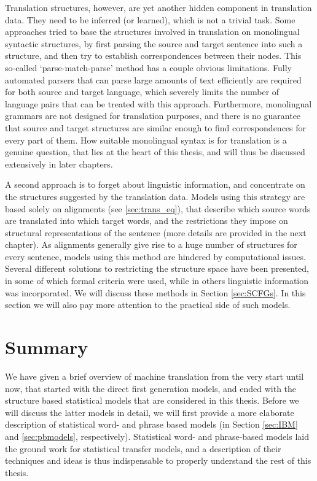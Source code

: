 Translation structures, however, are yet another hidden component in translation data. They need to be inferred (or learned), which is not a trivial task. Some approaches tried to base the structures involved in translation on monolingual syntactic structures, by first parsing the source and target sentence into such a structure, and then try to establish correspondences between their nodes. This so-called `parse-match-parse' method has a couple obvious limitations. Fully automated parsers that can parse large amounts of text efficiently are required for both source and target language, which severely limits the number of language pairs that can be treated with this approach. Furthermore, monolingual grammars are not designed for translation purposes, and there is no guarantee that source and target structures are similar enough to find correspondences for every part of them. How suitable monolingual syntax is for translation is a genuine question, that lies at the heart of this thesis, and will thus be discussed extensively in later chapters.

A second approach is to forget about linguistic information, and concentrate on the structures suggested by the translation data. Models using this strategy are based solely on alignments (see \ref{sec:trans_eq}), that describe which source words are translated into which target words, and the restrictions they impose on structural representations of the sentence (more details are provided in the next chapter). As alignments generally give rise to a huge number of structures for every sentence, models using this method are hindered by computational issues. Several different solutions to restricting the structure space have been presented, in some of which formal criteria were used, while in others linguistic information was incorporated. We will discuss these methods in Section \ref{sec:SCFGs}. In this section we will also pay more attention to the practical side of such models.

\section*{Summary}
We have given a brief overview of machine translation from the very start until now, that started with the direct first generation models, and ended with the structure based statistical models that are considered in this thesis. Before we will discuss the latter models in detail, we will first provide a more elaborate description of statistical word- and phrase based models (in Section \ref{sec:IBM} and \ref{sec:pbmodels}, respectively). Statistical word- and phrase-based models laid the ground work for statistical transfer models, and a description of their techniques and ideas is thus indispensable to properly understand the rest of this thesis.

